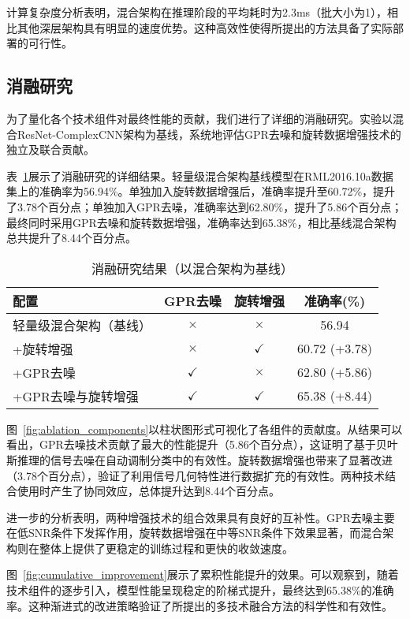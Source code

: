 \documentclass[conference]{IEEEtran}
\begin{document}
计算复杂度分析表明，混合架构在推理阶段的平均耗时为2.3ms（批大小为1），相比其他深层架构具有明显的速度优势。这种高效性使得所提出的方法具备了实际部署的可行性。

\subsection{消融研究}

为了量化各个技术组件对最终性能的贡献，我们进行了详细的消融研究。实验以混合ResNet-ComplexCNN架构为基线，系统地评估GPR去噪和旋转数据增强技术的独立及联合贡献。

表~\ref{tab:ablation_study}展示了消融研究的详细结果。轻量级混合架构基线模型在RML2016.10a数据集上的准确率为56.94\%。单独加入旋转数据增强后，准确率提升至60.72\%，提升了3.78个百分点；单独加入GPR去噪，准确率达到62.80\%，提升了5.86个百分点；最终同时采用GPR去噪和旋转数据增强，准确率达到65.38\%，相比基线混合架构总共提升了8.44个百分点。

\begin{table}[h]
\centering
\caption{消融研究结果（以混合架构为基线）}
\label{tab:ablation_study}
\begin{tabular}{@{}lccc@{}}
\toprule
配置 & GPR去噪 & 旋转增强 & 准确率(\%) \\
\midrule
轻量级混合架构（基线） & $\times$ & $\times$ & 56.94 \\
+旋转增强 & $\times$ & $\checkmark$ & 60.72 (+3.78) \\
+GPR去噪 & $\checkmark$ & $\times$ & 62.80 (+5.86) \\
+GPR去噪与旋转增强 & $\checkmark$ & $\checkmark$ & 65.38 (+8.44) \\
\bottomrule
\end{tabular}
\end{table}

图~\ref{fig:ablation_components}以柱状图形式可视化了各组件的贡献度。从结果可以看出，GPR去噪技术贡献了最大的性能提升（5.86个百分点），这证明了基于贝叶斯推理的信号去噪在自动调制分类中的有效性。旋转数据增强也带来了显著改进（3.78个百分点），验证了利用信号几何特性进行数据扩充的有效性。两种技术结合使用时产生了协同效应，总体提升达到8.44个百分点。

进一步的分析表明，两种增强技术的组合效果具有良好的互补性。GPR去噪主要在低SNR条件下发挥作用，旋转数据增强在中等SNR条件下效果显著，而混合架构则在整体上提供了更稳定的训练过程和更快的收敛速度。

图~\ref{fig:cumulative_improvement}展示了累积性能提升的效果。可以观察到，随着技术组件的逐步引入，模型性能呈现稳定的阶梯式提升，最终达到65.38\%的准确率。这种渐进式的改进策略验证了所提出的多技术融合方法的科学性和有效性。
\end{document}
